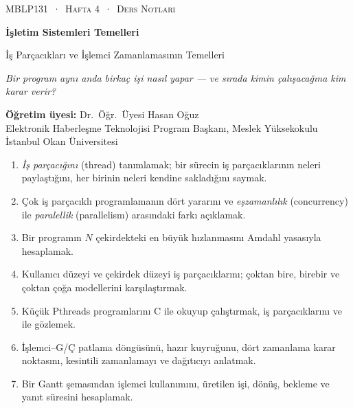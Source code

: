 \thispagestyle{empty}
\begin{tcolorbox}[enhanced,colback=dark,colframe=dark,arc=0pt,boxrule=0pt,
  left=18pt,right=18pt,top=20pt,bottom=20pt,coltext=white]
{\small\color{mint}\textsc{MBLP131 \,·\, Hafta 4 \,·\, Ders Notları}}\par\medskip
{\headfont\fontsize{26}{30}\selectfont\bfseries İşletim Sistemleri Temelleri}\par\medskip
{\large İş Parçacıkları ve İşlemci Zamanlamasının Temelleri}\par\smallskip
{\small\itshape\color{white!70} Bir program aynı anda birkaç işi nasıl yapar --- ve sırada kimin çalışacağına kim karar verir?}
\end{tcolorbox}

\vspace{0.4em}
\begin{minipage}[t]{0.70\linewidth}
\small
\textbf{Öğretim üyesi:} Dr.\ Öğr.\ Üyesi Hasan Oğuz\\
Elektronik Haberleşme Teknolojisi Program Başkanı, Meslek Yüksekokulu\\
İstanbul Okan Üniversitesi
\end{minipage}

\vspace{0.8em}
\begin{keyidea}
\begin{enumerate}[leftmargin=1.4em]
  \item \emph{İş parçacığını} (thread) tanımlamak; bir sürecin iş parçacıklarının neleri paylaştığını, her birinin neleri kendine sakladığını saymak.
  \item Çok iş parçacıklı programlamanın dört yararını ve \emph{eşzamanlılık} (concurrency) ile \emph{paralellik} (parallelism) arasındaki farkı açıklamak.
  \item Bir programın $N$ çekirdekteki en büyük hızlanmasını Amdahl yasasıyla hesaplamak.
  \item Kullanıcı düzeyi ve çekirdek düzeyi iş parçacıklarını; çoktan bire, birebir ve çoktan çoğa modellerini karşılaştırmak.
  \item Küçük Pthreads programlarını C ile okuyup çalıştırmak, iş parçacıklarını  ve  ile gözlemek.
  \item İşlemci--G/Ç patlama döngüsünü, hazır kuyruğunu, dört zamanlama karar noktasını, kesintili zamanlamayı ve dağıtıcıyı anlatmak.
  \item Bir Gantt şemasından işlemci kullanımını, üretilen işi, dönüş, bekleme ve yanıt süresini hesaplamak.
\end{enumerate}
\end{keyidea}

